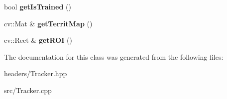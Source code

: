 \begin{DoxyCompactItemize}
\item 
\hypertarget{classTracker_aa27e4f7e9825f2c4940b12f455fdb093}{bool {\bfseries get\-Is\-Trained} ()}\label{classTracker_aa27e4f7e9825f2c4940b12f455fdb093}

\item 
\hypertarget{classTracker_a4967034e7a3513a4af95b028b1be0156}{cv\-::\-Mat \& {\bfseries get\-Territ\-Map} ()}\label{classTracker_a4967034e7a3513a4af95b028b1be0156}

\item 
\hypertarget{classTracker_a531a88b730fbde3d3133f57277754c72}{cv\-::\-Rect \& {\bfseries get\-R\-O\-I} ()}\label{classTracker_a531a88b730fbde3d3133f57277754c72}

\end{DoxyCompactItemize}


The documentation for this class was generated from the following files\-:\begin{DoxyCompactItemize}
\item 
headers/Tracker.\-hpp\item 
src/Tracker.\-cpp\end{DoxyCompactItemize}
